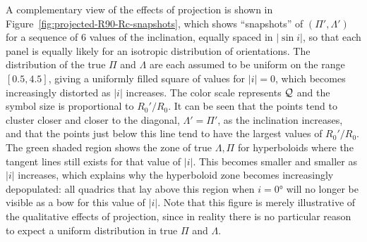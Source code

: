 \documentclass[useAMS, usenatbib, a4paper]{mnras}
\providecommand{\abs}[1]{\lvert#1\rvert}
\begin{document}
A complementary view of the effects of projection is shown in
Figure~\ref{fig:projected-R90-Rc-snapshots}, which shows ``snapshots''
of \((\Pi', \Lambda')\) for a sequence of 6 values of the inclination, equally
spaced in \(\abs{\sin {i}}\), so that each panel is equally likely for
an isotropic distribution of orientations.  The distribution of the
true \(\Pi\) and \(\Lambda\) are each assumed to be uniform on the range
\([0.5, 4.5]\), giving a uniformly filled square of values for
\(\abs{i} = 0\), which becomes increasingly distorted as \(\abs{i}\)
increases.  The color scale represents \(\mathcal{Q}\) and the symbol size is
proportional to \(R_0'/R_0\).  It can be seen that the points tend to
cluster closer and closer to the diagonal, \(\Lambda' = \Pi'\), as the
inclination increases, and that the points just below this line tend
to have the largest values of \(R_0'/R_0\).  The green shaded region
shows the zone of true \(\Lambda, \Pi\) for hyperboloids where the tangent
lines still exists for that value of \(\abs{i}\).  This becomes
smaller and smaller as \(\abs{i}\) increases, which explains why the
hyperboloid zone becomes increasingly depopulated: all quadrics that
lay above this region when \(i = \ang{0}\) will no longer be visible as a
bow for this value of \(\abs{i}\).  Note that this figure is merely
illustrative of the qualitative effects of projection, since in
reality there is no particular reason to expect a uniform distribution
in true \(\Pi\) and \(\Lambda\).



\end{document}
